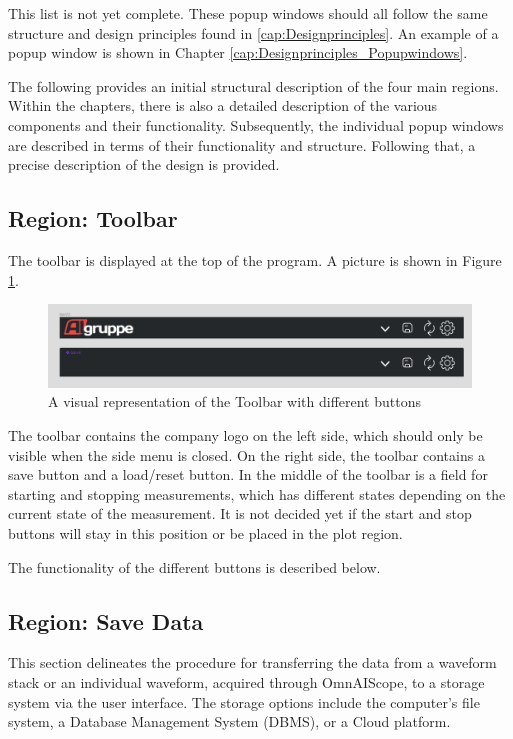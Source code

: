 \documentclass[]{scrreprt}
\begin{document}
This list is not yet complete. These popup windows should all follow the same structure and design principles found in \ref{cap:Designprinciples}. An example of a popup window is shown in Chapter \ref{cap:Designprinciples_Popupwindows}.

The following provides an initial structural description of the four main regions. Within the chapters, there is also a detailed description of the various components and their functionality. Subsequently, the individual popup windows are described in terms of their functionality and structure. Following that, a precise description of the design is provided.

\subsection{Region: Toolbar}

The toolbar is displayed at the top of the program. A picture is shown in Figure \ref{fig:toolbar}.

\begin{figure}
    \includegraphics[width=.9\textwidth]{assets/pictures/Toolbar states.png}
    \caption[]{A visual representation of the Toolbar with different buttons}
    \label{fig:toolbar}
\end{figure}

The toolbar contains the company logo on the left side, which should only be visible when the side menu is closed. On the right side, the toolbar contains a save button and a load/reset button. In the middle of the toolbar is a field for starting and stopping measurements, which has different states depending on the current state of the measurement. It is not decided yet if the start and stop buttons will stay in this position or be placed in the plot region.

The functionality of the different buttons is described below.

\subsection{Region: Save Data}

This section delineates the procedure for transferring the data from a waveform stack or an individual waveform, acquired through OmnAIScope, to a storage system via the user interface. The storage options include the computer's file system, a Database Management System (DBMS), or a Cloud platform.
\end{document}
